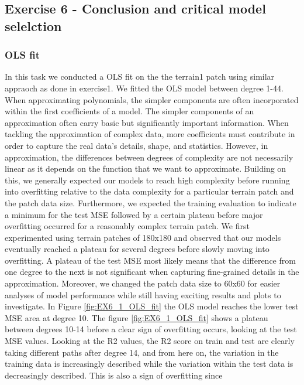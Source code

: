 \documentclass[11pt, a4paper]{article}
\begin{document}
\newpage
\subsection*{Exercise 6 - Conclusion and critical model selelction}
\subsubsection*{OLS fit}
In this task we conducted a OLS fit on the the terrain1 patch using similar appraoch as done in exercise1. We fitted the OLS model between degree 1-44.
When approximating polynomials, the simpler components are often incorporated within the first coefficients of a model. The simpler components of an approximation
often carry basic but significantly important information. When tackling the approximation of complex data, more coefficients must contribute in order to capture the
real data's details, shape, and statistics. However, in approximation, the differences between degrees of complexity are not necessarily linear as it depends on the
function that we want to approximate. Building on this, we generally expected our models to reach high complexity before running into overfitting relative to the data
complexity for a particular terrain patch and the patch data size. Furthermore, we expected the training evaluation to indicate a minimum for the test MSE followed by a
certain plateau before major overfitting occurred for a reasonably complex terrain patch.
We first experimented using terrain patches of 180x180 and observed that our models eventually reached a plateau for several degrees before slowly moving into overfitting.
A plateau of the test MSE most likely means that the difference from one degree to the next is not significant when capturing fine-grained details in the approximation.
Moreover, we changed the patch data size to 60x60 for easier analyses of model performance while still having exciting results and plots to investigate.
In Figure \ref{fig:EX6_1_OLS_fit} the OLS model reaches the lower test MSE area at degree 10. The figure \ref{fig:EX6_1_OLS_fit} shows a plateau between degrees 10-14 before a clear sign of overfitting occurs,
looking at the test MSE values. Looking at the R2 values, the R2 score on train and test are clearly taking different paths after degree 14, and from here on,
the variation in the training data is increasingly described while the variation within the test data is decreasingly described. This is also a sign of overfitting since
\end{document}
